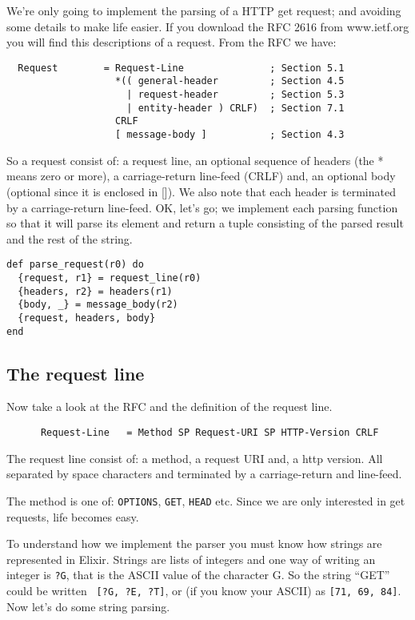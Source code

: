 \documentclass[a4paper,11pt]{article}
\begin{document}
We're only going to implement the parsing of a HTTP get request; and
avoiding some details to make life easier. If you download the RFC 2616 from
www.ietf.org you will find this descriptions of a request. From the RFC we have:

\begin{verbatim}
  Request        = Request-Line               ; Section 5.1
                   *(( general-header         ; Section 4.5
                     | request-header         ; Section 5.3
                     | entity-header ) CRLF)  ; Section 7.1
                   CRLF
                   [ message-body ]           ; Section 4.3
\end{verbatim}

So a request consist of: a request line, an optional sequence of
headers (the * means zero or more), a carriage-return line-feed (CRLF)
and, an optional body (optional since it is enclosed in []). We also
note that each header is terminated by a carriage-return
line-feed. OK, let's go; we implement each parsing function so that it
will parse its element and return a tuple consisting of the parsed
result and the rest of the string.

\begin{verbatim}
def parse_request(r0) do
  {request, r1} = request_line(r0)
  {headers, r2} = headers(r1)
  {body, _} = message_body(r2)
  {request, headers, body}
end
\end{verbatim}

\subsection{The request line}
Now take a look at the RFC and the definition of the request line.

\begin{verbatim}
      Request-Line   = Method SP Request-URI SP HTTP-Version CRLF
\end{verbatim}

The request line consist of: a method, a request URI and, a http
version. All separated by space characters and terminated by a
carriage-return and line-feed.

The method is one of: {\tt OPTIONS}, {\tt GET}, {\tt HEAD} etc. Since we
are only interested in get requests, life becomes easy.

To understand how we implement the parser you must know how strings
are represented in Elixir. Strings are lists of integers and one way
of writing an integer is {\tt ?G}, that is the ASCII value of the
character G. So the string ``GET'' could be written {\tt
  [?G, ?E, ?T]}, or (if you know your ASCII) as {\tt [71, 69, 84]}. Now
let's do some string parsing.
\end{document}
